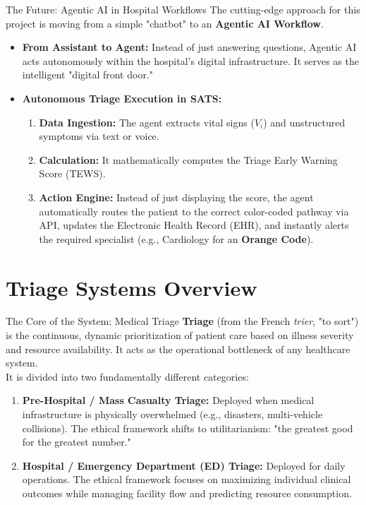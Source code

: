 \documentclass[aspectratio=169]{beamer}
\begin{document}
	\begin{frame}{The Future: Agentic AI in Hospital Workflows}
		The cutting-edge approach for this project is moving from a simple "chatbot" to an \textbf{Agentic AI Workflow}.
		\vspace{0.2cm}
		\begin{itemize}
			\item \textbf{From Assistant to Agent:} Instead of just answering questions, Agentic AI acts autonomously within the hospital's digital infrastructure. It serves as the intelligent "digital front door."
			\item \textbf{Autonomous Triage Execution in SATS:} 
			\begin{enumerate}
				\item \textbf{Data Ingestion:} The agent extracts vital signs ($V_i$) and unstructured symptoms via text or voice.
				\item \textbf{Calculation:} It mathematically computes the Triage Early Warning Score (TEWS).
				\item \textbf{Action Engine:} Instead of just displaying the score, the agent automatically routes the patient to the correct color-coded pathway via API, updates the Electronic Health Record (EHR), and instantly alerts the required specialist (e.g., Cardiology for an \textcolor{triageorange}{\textbf{Orange Code}}).
			\end{enumerate}
		\end{itemize}
	\end{frame}
	\section{Triage Systems Overview}
	
	\begin{frame}{The Core of the System: Medical Triage}
		\textbf{Triage} (from the French \textit{trier}, "to sort") is the continuous, dynamic prioritization of patient care based on illness severity and resource availability. It acts as the operational bottleneck of any healthcare system.
		\vspace{0.2cm}
		\\It is divided into two fundamentally different categories:
		\begin{enumerate}
			\item \textbf{Pre-Hospital / Mass Casualty Triage:} Deployed when medical infrastructure is physically overwhelmed (e.g., disasters, multi-vehicle collisions). The ethical framework shifts to utilitarianism: "the greatest good for the greatest number."
			\item \textbf{Hospital / Emergency Department (ED) Triage:} Deployed for daily operations. The ethical framework focuses on maximizing individual clinical outcomes while managing facility flow and predicting resource consumption.
		\end{enumerate}
	\end{frame}
	
\end{document}

